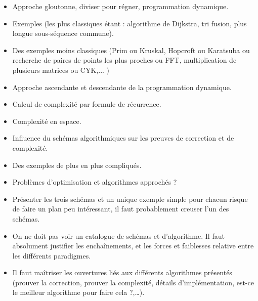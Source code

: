\documentclass{agregfiche}
\begin{document}
\secindispensables
\begin{itemize}
    \item Approche gloutonne, diviser pour régner, programmation dynamique.
    \item Exemples (les plus classiques étant : algorithme de Dijkstra, tri fusion, plus longue sous-séquence commune).
\end{itemize}

\secasavoir

\begin{itemize}
    \item Des exemples moins classiques (Prim ou Kruskal, Hopcroft ou Karatsuba ou recherche de paires de points les plus proches ou FFT, multiplication de plusieurs matrices ou CYK,...  )
    \item Approche ascendante et descendante de la programmation dynamique.
    \item Calcul de complexité par formule de récurrence.
    \item Complexité en espace.
    \item Influence du schémas algorithmiques sur les preuves de correction et de complexité.
\end{itemize}

\secidees

\begin{itemize}
    \item Des exemples de plus en plus compliqués.
    \item Problèmes d'optimisation et algorithmes approchés ?
\end{itemize}

\secpieges

\begin{itemize}
    \item Présenter les trois schémas et un unique exemple simple pour chacun risque de faire un plan peu intéressant, il faut probablement creuser l'un des schémas.
    \item On ne doit pas voir un catalogue de schémas et d'algorithme. Il faut absolument justifier les enchaînements, et les forces et faiblesses relative entre les différents paradigmes.
    \item Il faut maîtriser les ouvertures liés aux différents algorithmes présentés (prouver la correction, prouver la complexité, détails d'implémentation, est-ce le meilleur algorithme pour faire cela ?,\ldots).

\end{itemize}
\end{document}
